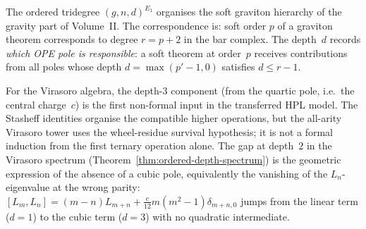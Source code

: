 \begin{remark}
\label{rem:tridegree-physical}
The ordered tridegree $(g,n,d)^{E_1}$ organises the soft graviton
hierarchy of the gravity part of Volume~II\@. The correspondence is:
soft order $p$ of a graviton theorem corresponds to degree
$r = p + 2$ in the bar complex. The depth~$d$ records
\emph{which OPE pole is responsible}: a soft theorem at order~$p$
receives contributions from all poles whose depth
$d = \max(p'-1,0)$ satisfies $d \leq r - 1$.

For the Virasoro algebra, the depth-$3$ component
(from the quartic pole, i.e.\ the central charge~$c$) is the
first non-formal input in the transferred HPL model. The
Stasheff identities organise the compatible higher operations, but
the all-arity Virasoro tower uses the wheel-residue survival
hypothesis; it is not a formal induction from the first ternary
operation alone. The gap at depth~$2$ in the Virasoro
spectrum (Theorem~\ref{thm:ordered-depth-spectrum}) is the
geometric expression of the absence of a cubic pole,
equivalently the vanishing of the $L_n$-eigenvalue at the wrong
parity: $[L_m, L_n] = (m-n)L_{m+n} + \frac{c}{12}m(m^2-1)\delta_{m+n,0}$
jumps from the linear term ($d = 1$) to the cubic term ($d = 3$)
with no quadratic intermediate.
\end{remark}

